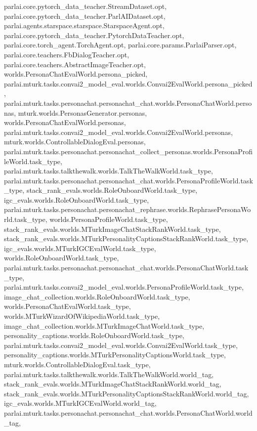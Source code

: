 parlai.\+core.\+pytorch\+\_\+data\+\_\+teacher.\+Stream\+Dataset.\+opt, parlai.\+core.\+pytorch\+\_\+data\+\_\+teacher.\+Parl\+A\+I\+Dataset.\+opt, parlai.\+agents.\+starspace.\+starspace.\+Starspace\+Agent.\+opt, parlai.\+core.\+pytorch\+\_\+data\+\_\+teacher.\+Pytorch\+Data\+Teacher.\+opt, parlai.\+core.\+torch\+\_\+agent.\+Torch\+Agent.\+opt, parlai.\+core.\+params.\+Parlai\+Parser.\+opt, parlai.\+core.\+teachers.\+Fb\+Dialog\+Teacher.\+opt, parlai.\+core.\+teachers.\+Abstract\+Image\+Teacher.\+opt, worlds.\+Persona\+Chat\+Eval\+World.\+persona\+\_\+picked, parlai.\+mturk.\+tasks.\+convai2\+\_\+model\+\_\+eval.\+worlds.\+Convai2\+Eval\+World.\+persona\+\_\+picked, parlai.\+mturk.\+tasks.\+personachat.\+personachat\+\_\+chat.\+worlds.\+Persona\+Chat\+World.\+personas, mturk.\+worlds.\+Personas\+Generator.\+personas, worlds.\+Persona\+Chat\+Eval\+World.\+personas, parlai.\+mturk.\+tasks.\+convai2\+\_\+model\+\_\+eval.\+worlds.\+Convai2\+Eval\+World.\+personas, mturk.\+worlds.\+Controllable\+Dialog\+Eval.\+personas, parlai.\+mturk.\+tasks.\+personachat.\+personachat\+\_\+collect\+\_\+personas.\+worlds.\+Persona\+Profile\+World.\+task\+\_\+type, parlai.\+mturk.\+tasks.\+talkthewalk.\+worlds.\+Talk\+The\+Walk\+World.\+task\+\_\+type, parlai.\+mturk.\+tasks.\+personachat.\+personachat\+\_\+chat.\+worlds.\+Persona\+Profile\+World.\+task\+\_\+type, stack\+\_\+rank\+\_\+evals.\+worlds.\+Role\+Onboard\+World.\+task\+\_\+type, igc\+\_\+evals.\+worlds.\+Role\+Onboard\+World.\+task\+\_\+type, parlai.\+mturk.\+tasks.\+personachat.\+personachat\+\_\+rephrase.\+worlds.\+Rephrase\+Persona\+World.\+task\+\_\+type, worlds.\+Persona\+Profile\+World.\+task\+\_\+type, stack\+\_\+rank\+\_\+evals.\+worlds.\+M\+Turk\+Image\+Chat\+Stack\+Rank\+World.\+task\+\_\+type, stack\+\_\+rank\+\_\+evals.\+worlds.\+M\+Turk\+Personality\+Captions\+Stack\+Rank\+World.\+task\+\_\+type, igc\+\_\+evals.\+worlds.\+M\+Turk\+I\+G\+C\+Eval\+World.\+task\+\_\+type, worlds.\+Role\+Onboard\+World.\+task\+\_\+type, parlai.\+mturk.\+tasks.\+personachat.\+personachat\+\_\+chat.\+worlds.\+Persona\+Chat\+World.\+task\+\_\+type, parlai.\+mturk.\+tasks.\+convai2\+\_\+model\+\_\+eval.\+worlds.\+Persona\+Profile\+World.\+task\+\_\+type, image\+\_\+chat\+\_\+collection.\+worlds.\+Role\+Onboard\+World.\+task\+\_\+type, worlds.\+Persona\+Chat\+Eval\+World.\+task\+\_\+type, worlds.\+M\+Turk\+Wizard\+Of\+Wikipedia\+World.\+task\+\_\+type, image\+\_\+chat\+\_\+collection.\+worlds.\+M\+Turk\+Image\+Chat\+World.\+task\+\_\+type, personality\+\_\+captions.\+worlds.\+Role\+Onboard\+World.\+task\+\_\+type, parlai.\+mturk.\+tasks.\+convai2\+\_\+model\+\_\+eval.\+worlds.\+Convai2\+Eval\+World.\+task\+\_\+type, personality\+\_\+captions.\+worlds.\+M\+Turk\+Personality\+Captions\+World.\+task\+\_\+type, mturk.\+worlds.\+Controllable\+Dialog\+Eval.\+task\+\_\+type, parlai.\+mturk.\+tasks.\+talkthewalk.\+worlds.\+Talk\+The\+Walk\+World.\+world\+\_\+tag, stack\+\_\+rank\+\_\+evals.\+worlds.\+M\+Turk\+Image\+Chat\+Stack\+Rank\+World.\+world\+\_\+tag, stack\+\_\+rank\+\_\+evals.\+worlds.\+M\+Turk\+Personality\+Captions\+Stack\+Rank\+World.\+world\+\_\+tag, igc\+\_\+evals.\+worlds.\+M\+Turk\+I\+G\+C\+Eval\+World.\+world\+\_\+tag, parlai.\+mturk.\+tasks.\+personachat.\+personachat\+\_\+chat.\+worlds.\+Persona\+Chat\+World.\+world\+\_\+tag, 
